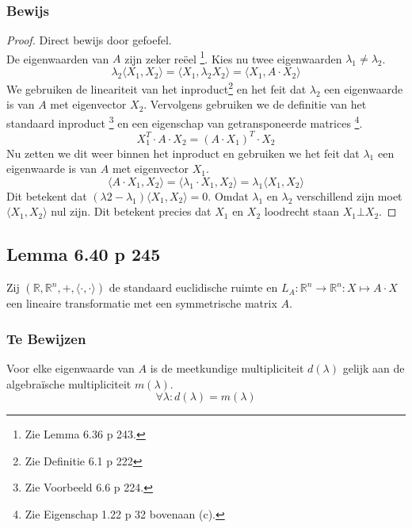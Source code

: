 \documentclass[lineaire_algebra_oplossingen.tex]{subfiles}
\begin{document}
\subsubsection*{Bewijs}
\begin{proof}
Direct bewijs door gefoefel.\\
De eigenwaarden van $A$ zijn zeker re\"eel \footnote{Zie Lemma 6.36 p 243.}. Kies nu twee eigenwaarden $\lambda_1 \neq \lambda_2$. 
\[
\lambda_2 \langle X_1 , X_2 \rangle = \langle X_1, \lambda_2X_2 \rangle=\langle X_1, A\cdot X_2 \rangle
\]
We gebruiken de lineariteit van het inproduct\footnote{Zie Definitie 6.1 p 222} en het feit dat $\lambda_2$ een eigenwaarde is van $A$ met eigenvector $X_2$. Vervolgens gebruiken we de definitie van het standaard inproduct \footnote{Zie Voorbeeld 6.6 p 224.} en een eigenschap van getransponeerde matrices \footnote{Zie Eigenschap 1.22 p 32 bovenaan (c).}.
\[
X_1^T \cdot A\cdot X_2 = (A \cdot X_1)^T \cdot X_2
\]
Nu zetten we dit weer binnen het inproduct en gebruiken we het feit dat $\lambda_1$ een eigenwaarde is van $A$ met eigenvector $X_1$.
\[
\langle A \cdot X_1 , X_2 \rangle = \langle \lambda_1 \cdot X_1 , X_2 \rangle = \lambda_1 \langle X_1 , X_2 \rangle 
\]
Dit betekent dat $(\lambda 2-\lambda_1)\langle X_1 , X_2 \rangle =0$. Omdat $\lambda_1$ en $\lambda_2$ verschillend zijn moet $\langle X_1 , X_2 \rangle$ nul zijn. Dit betekent precies dat $X_1$ en $X_2$ loodrecht staan $X_1 \bot X_2$.
\end{proof}

\subsection{Lemma 6.40 p 245}
Zij $(\mathbb{R},\mathbb{R}^n,+,\langle \cdot , \cdot \rangle)$ de standaard euclidische ruimte en $L_A : \mathbb{R}^n \rightarrow \mathbb{R}^n: X \mapsto A \cdot X$ een lineaire transformatie met een symmetrische matrix $A$.
\subsubsection*{Te Bewijzen}
Voor elke eigenwaarde van $A$ is de meetkundige multipliciteit $d(\lambda)$ gelijk aan de algebra\"ische multipliciteit $m(\lambda)$.
\[
\forall\lambda: d(\lambda) = m(\lambda)
\]
\end{document}

